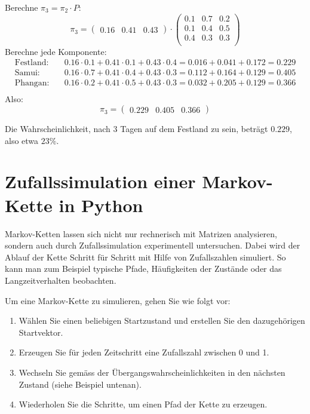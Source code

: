 \begin{mychallenge}
\begin{myanswer}
        Berechne $\pi_3 = \pi_2 \cdot P$:
        \[
            \pi_3 = \begin{pmatrix} 0.16 & 0.41 & 0.43 \end{pmatrix}
            \cdot
            \begin{pmatrix}
                0.1 & 0.7 & 0.2 \\
                0.1 & 0.4 & 0.5 \\
                0.4 & 0.3 & 0.3 \\
            \end{pmatrix}
        \]
        Berechne jede Komponente:
        \begin{align*}
            \text{Festland:} & \quad 0.16 \cdot 0.1 + 0.41 \cdot 0.1 + 0.43 \cdot 0.4 = 0.016 + 0.041 + 0.172 = 0.229 \\
            \text{Samui:}    & \quad 0.16 \cdot 0.7 + 0.41 \cdot 0.4 + 0.43 \cdot 0.3 = 0.112 + 0.164 + 0.129 = 0.405 \\
            \text{Phangan:}  & \quad 0.16 \cdot 0.2 + 0.41 \cdot 0.5 + 0.43 \cdot 0.3 = 0.032 + 0.205 + 0.129 = 0.366 \\
        \end{align*}
        Also:
        \[
            \pi_3 = \begin{pmatrix} 0.229 & 0.405 & 0.366 \end{pmatrix}
        \]

        Die Wahrscheinlichkeit, nach 3 Tagen auf dem Festland zu sein, beträgt $0.229$, also etwa $23\%$.
    \end{myanswer}
\end{mychallenge}


\section{Zufallssimulation einer Markov-Kette in Python}

Markov-Ketten lassen sich nicht nur rechnerisch mit Matrizen analysieren, sondern auch durch Zufallssimulation experimentell untersuchen. Dabei wird der Ablauf der Kette Schritt für Schritt mit Hilfe von Zufallszahlen simuliert. So kann man zum Beispiel typische Pfade, Häufigkeiten der Zustände oder das Langzeitverhalten beobachten.

Um eine Markov-Kette zu simulieren, gehen Sie wie folgt vor:
\begin{enumerate}
    \item Wählen Sie einen beliebigen Startzustand und erstellen Sie den dazugehörigen Startvektor.
    \item Erzeugen Sie für jeden Zeitschritt eine Zufallszahl zwischen 0 und 1.
    \item Wechseln Sie gemäss der Übergangswahrscheinlichkeiten in den nächsten Zustand (siehe Beispiel untenan).
    \item Wiederholen Sie die Schritte, um einen Pfad der Kette zu erzeugen.
\end{enumerate}

